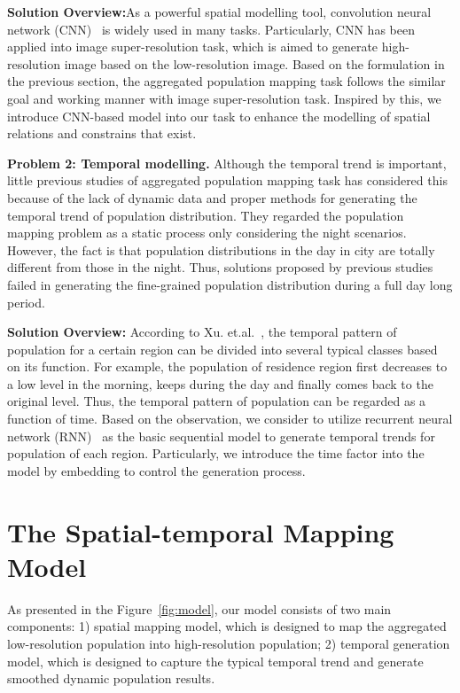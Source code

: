 \documentclass[letterpaper]{article} %
\begin{document}
\textbf{Solution Overview:}As a powerful spatial modelling tool, convolution neural network (CNN)~\cite{LeCun1989Hand,He2016DeepRL} is widely used in many tasks. Particularly, CNN has been applied into image super-resolution task, which is aimed to generate high-resolution image based on the low-resolution image. Based on the formulation in the previous section, the aggregated population mapping task follows the similar goal and working manner with image super-resolution task. Inspired by this, we introduce CNN-based model into our task to enhance the modelling of spatial relations and constrains that exist. 

\textbf{Problem 2: Temporal modelling.} Although the temporal trend is important, little previous studies of aggregated population mapping task has considered this because of the lack of dynamic data and proper methods for generating the temporal trend of population distribution. They regarded the population mapping problem as a static process only considering the night scenarios. However, the fact is that population distributions in the day in city are totally different from those in the night. Thus, solutions proposed by previous studies failed in generating the fine-grained population distribution during a full day long period.  

\textbf{Solution Overview:} According to Xu. et.al.~\cite{Xu2016ContextawareRP}, the temporal pattern of population for a certain region can be divided into several typical classes based on its function. For example, the population of residence region first decreases to a low level in the morning, keeps during the day and finally comes back to the original level. Thus, the temporal pattern of population can be regarded as a function of time. Based on the observation, we consider to utilize recurrent neural network (RNN)~\cite{Lipton2015A,Hochreiter194LSTM} as the basic sequential model to generate temporal trends for population of each region. Particularly, we introduce the time factor into the model by embedding to control the generation process. 


\section{The Spatial-temporal Mapping Model}
 As presented in the Figure~\ref{fig:model}, our model consists of two main components: 1) spatial mapping model, which is designed to map the aggregated low-resolution population into high-resolution population; 2) temporal generation model, which is designed to capture the typical temporal trend and generate smoothed dynamic population results. 
\end{document}
